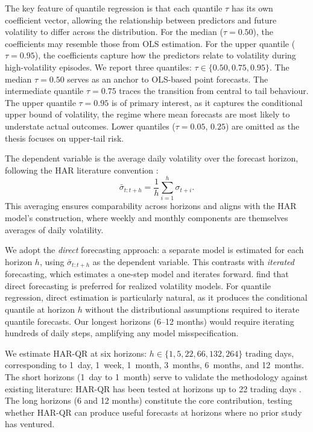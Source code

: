 The key feature of quantile regression is that each quantile $\tau$ has its
own coefficient vector, allowing the relationship between predictors and
future volatility to differ across the distribution. For the median
($\tau = 0.50$), the coefficients may resemble those from OLS estimation.
For the upper quantile ($\tau = 0.95$), the coefficients capture how the
predictors relate to volatility during high-volatility episodes. We report three quantiles: $\tau \in \{0.50, 0.75, 0.95\}$. The median
$\tau = 0.50$ serves as an anchor to OLS-based point forecasts. The
intermediate quantile $\tau = 0.75$ traces the transition from central
to tail behaviour. The upper quantile $\tau = 0.95$ is of primary
interest, as it captures the conditional upper bound of volatility, the
regime where mean forecasts are most likely to understate actual outcomes.
Lower quantiles ($\tau = 0.05$, $0.25$) are omitted as the thesis focuses
on upper-tail risk.

The dependent variable is the average daily volatility over the forecast
horizon, following the HAR literature convention
\parencite{ghyselsDirectIteratedMultiperiod2019,
clementsHarvestingHARXVolatility2024}:
\begin{equation}
\label{eq:horizon-vol}
\bar{\sigma}_{t:t+h} = \frac{1}{h} \sum_{i=1}^{h} \sigma_{t+i}.
\end{equation}
This averaging ensures comparability across horizons and aligns with the
HAR model's construction, where weekly and monthly components are themselves
averages of daily volatility.

We adopt the \emph{direct} forecasting approach: a separate model is
estimated for each horizon $h$, using $\bar{\sigma}_{t:t+h}$ as the
dependent variable. This contrasts with \emph{iterated} forecasting, which
estimates a one-step model and iterates forward.
\textcite{ghyselsDirectIteratedMultiperiod2019} find that direct forecasting
is preferred for realized volatility models. For quantile regression,
direct estimation is particularly natural, as it produces the conditional
quantile at horizon $h$ without the distributional assumptions required to
iterate quantile forecasts. Our longest horizons (6--12 months) would
require iterating hundreds of daily steps, amplifying any model
misspecification.

We estimate HAR-QR at six horizons: $h \in \{1, 5, 22, 66, 132, 264\}$
trading days, corresponding to 1~day, 1~week, 1~month, 3~months, 6~months,
and 12~months. The short horizons (1~day to 1~month) serve to validate the
methodology against existing literature: HAR-QR has been tested at horizons
up to 22 trading days \parencite{lyocsaImprovingStockMarket2021}. The long
horizons (6 and 12 months) constitute the core contribution, testing
whether HAR-QR can produce useful forecasts at horizons where no prior study
has ventured.


